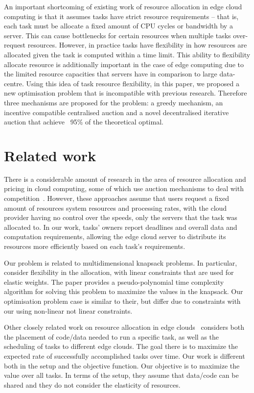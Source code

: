 An important shortcoming of existing work of resource allocation in edge cloud computing is that it assumes tasks have
strict resource requirements -- that is, each task must be allocate a fixed amount of CPU cycles or bandwidth by a
server. This can cause bottlenecks for certain resources when multiple tasks over-request resources. However, in
practice tasks have flexibility in how resources are allocated given the task is computed within a time limit. This
ability to flexibility allocate resource is additionally important in the case of edge computing due to the limited
resource capacities that servers have in comparison to large data-centre. Using this idea of task resource flexibility,
in this paper, we proposed a new optimisation problem that is incompatible with previous research. Therefore three
mechanisms are proposed for the problem: a greedy mechanism, an incentive compatible centralised auction and a novel
decentralised iterative auction that achieve ~95\% of the theoretical optimal.


\section{Related work}\label{sec:related-work}
There is a considerable amount of research in the area of resource allocation and pricing in cloud computing, some of
which use auction mechanisms to deal with competition~\cite{KUMAR2017234,Zhang2017,Du2019,Bi2019}.
However, these approaches assume that users request a fixed amount of resources system resources and processing rates,
with the cloud provider having no control over the speeds, only the servers that the task was allocated to. In our
work, tasks' owners report deadlines and overall data and computation requirements, allowing the edge cloud server to
distribute its resources more efficiently based on each task's requirements.

Our problem is related to multidimensional knapsack problems. In particular, \citet{Nip2017} consider flexibility in
the allocation, with linear constraints that are used for elastic weights. The paper provides a pseudo-polynomial time
complexity algorithm for solving this problem to maximize the values in the knapsack. Our optimisation problem case is
similar to their, but differ due to constraints with our using non-linear not linear constraints.

Other closely related work on resource allocation in edge clouds~\cite{vaji_infocom} considers both the placement of
code/data needed to run a specific task, as well as the scheduling of tasks to different edge clouds. The goal there is
to maximize the expected rate of successfully accomplished tasks over time. Our work is different both in the setup and
the objective function. Our objective is to maximize the value over all tasks. In terms of the setup, they assume that
data/code can be shared and they do not consider the elasticity of resources.